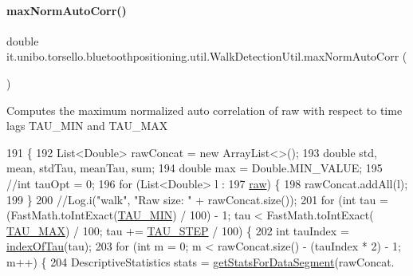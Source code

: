 \paragraph{\texorpdfstring{max\+Norm\+Auto\+Corr()}{maxNormAutoCorr()}}
{\footnotesize\ttfamily double it.\+unibo.\+torsello.\+bluetoothpositioning.\+util.\+Walk\+Detection\+Util.\+max\+Norm\+Auto\+Corr (\begin{DoxyParamCaption}{ }\end{DoxyParamCaption})\hspace{0.3cm}{\ttfamily [private]}}

Computes the maximum normalized auto correlation of raw with respect to time lags T\+A\+U\+\_\+\+M\+IN and T\+A\+U\+\_\+\+M\+AX 
\begin{DoxyCode}
191                                      \{
192         List<Double> rawConcat = \textcolor{keyword}{new} ArrayList<>();
193         \textcolor{keywordtype}{double} std, mean, stdTau, meanTau, sum;
194         \textcolor{keywordtype}{double} max = Double.MIN\_VALUE;
195         \textcolor{comment}{//int tauOpt = 0;}
196         \textcolor{keywordflow}{for} (List<Double> l :
197                 \hyperlink{classit_1_1unibo_1_1torsello_1_1bluetoothpositioning_1_1util_1_1WalkDetectionUtil_a985270e2b9d4202985cb987eef136a9e_a985270e2b9d4202985cb987eef136a9e}{raw}) \{
198             rawConcat.addAll(l);
199         \}
200         \textcolor{comment}{//Log.i("walk", "Raw size: " + rawConcat.size());}
201         \textcolor{keywordflow}{for} (\textcolor{keywordtype}{int} tau = (FastMath.toIntExact(\hyperlink{classit_1_1unibo_1_1torsello_1_1bluetoothpositioning_1_1util_1_1WalkDetectionUtil_a9f09899b6ae21b2b95de40b42dba6559_a9f09899b6ae21b2b95de40b42dba6559}{TAU\_MIN}) / 100) - 1; tau < FastMath.toIntExact(
      \hyperlink{classit_1_1unibo_1_1torsello_1_1bluetoothpositioning_1_1util_1_1WalkDetectionUtil_a228c8fb6098bacfb92e578a1efc8e7c0_a228c8fb6098bacfb92e578a1efc8e7c0}{TAU\_MAX}) / 100; tau += \hyperlink{classit_1_1unibo_1_1torsello_1_1bluetoothpositioning_1_1util_1_1WalkDetectionUtil_ab5ae731e91530d10bde22bec4c223a8f_ab5ae731e91530d10bde22bec4c223a8f}{TAU\_STEP} / 100) \{
202             \textcolor{keywordtype}{int} tauIndex = \hyperlink{classit_1_1unibo_1_1torsello_1_1bluetoothpositioning_1_1util_1_1WalkDetectionUtil_ad619ce1a15adfee0f62b6a1e494cac9d_ad619ce1a15adfee0f62b6a1e494cac9d}{indexOfTau}(tau);
203             \textcolor{keywordflow}{for} (\textcolor{keywordtype}{int} m = 0; m < rawConcat.size() - (tauIndex * 2) - 1; m++) \{
204                 DescriptiveStatistics stats = \hyperlink{classit_1_1unibo_1_1torsello_1_1bluetoothpositioning_1_1util_1_1WalkDetectionUtil_a2a153d4d32a5684f7be18d7ee88daacd_a2a153d4d32a5684f7be18d7ee88daacd}{getStatsForDataSegment}(rawConcat.

\end{DoxyCode}
